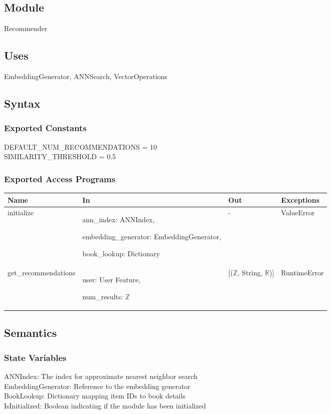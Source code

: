 \documentclass[12pt, titlepage]{article}
\begin{document}
\subsection{Module}

Recommender

\subsection{Uses}
EmbeddingGenerator, ANNSearch, VectorOperations

\subsection{Syntax}

\subsubsection{Exported Constants}
DEFAULT\_NUM\_RECOMMENDATIONS = 10\\
SIMILARITY\_THRESHOLD = 0.5
\subsubsection{Exported Access Programs}

\begin{center}
  \begin{tabular}{p{5cm} p{4cm} p{4cm} p{2cm}}
  \hline
  \textbf{Name} & \textbf{In} & \textbf{Out} & \textbf{Exceptions} \\
  \hline
  initialize & ann\_index: ANNIndex,
  
  embedding\_generator: EmbeddingGenerator,
  
  book\_lookup: Dictionary & -& ValueError \\
  \hline
  get\_recommendations & user: User Feature,
  
  num\_results: $\mathbb{Z}$ & [($\mathbb{Z}$, String, $\mathbb{R}$)] & RuntimeError \\
  \hline
  \end{tabular}
  \end{center}

\subsection{Semantics}

\subsubsection{State Variables}
ANNIndex: The index for approximate nearest neighbor search\\
EmbeddingGenerator: Reference to the embedding generator\\
BookLookup: Dictionary mapping item IDs to book details\\
IsInitialized: Boolean indicating if the module has been initialized
\end{document}
